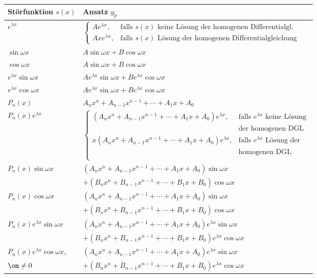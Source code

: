 \documentclass[a4paper]{article}
\begin{document}
\bigskip

\def\arraystretch{1.5}
\begin{tabular}{p{}|p{}}
\hline
St\"orfunktion $s(x)$ & Ansatz $y_p$ \\
\hline
$e^{\lambda x}$ & 
$
\left\{
\begin{array}{rl}
Ae^{\lambda x}, & \text{falls } s(x) \text{ keine L\"osung der homogenen Differentialgl.} \\
Axe^{\lambda x}, & \text{falls } s(x) \text{ L\"osung der homogenen Differentialgleichung}
\end{array} \right.
$ \\
$\sin \omega x$ & $A\sin \omega x+B\cos\omega x$ \\
$\cos \omega x$ & $A\sin \omega x+B\cos\omega x$ \\
$e^{\lambda x}\sin \omega x$ & $Ae^{\lambda x}\sin \omega x+Be^{\lambda x}\cos\omega x$ \\
$e^{\lambda x}\cos \omega x$ & $Ae^{\lambda x}\sin \omega x+Be^{\lambda x}\cos\omega x$ \\
$P_n(x)$ & $A_n x^n+A_{n-1} x^{n-1}+\cdots+A_1 x+A_0$ \\
$P_n(x)e^{\lambda x}$ & 
$
\left\{
\begin{array}{rl}
(A_n x^n+A_{n-1} x^{n-1}+\cdots+A_1 x+A_0)e^{\lambda x}, & \text{falls } e^{\lambda x} \text{ keine L\"osung} \\
 & \text{der homogenen DGL} \\
x(A_n x^n+A_{n-1} x^{n-1}+\cdots+A_1 x+A_0)e^{\lambda x}, & \text{falls } e^{\lambda x} \text{ L\"osung der} \\
 & \text{homogenen DGL} \\
\end{array} \right.
$ \\
$P_n(x)\sin \omega x$ & $(A_n x^n+A_{n-1} x^{n-1}+\cdots+A_1 x+A_0)\sin \omega x$ \\
 & \qquad$+(B_n x^n+B_{n-1} x^{n-1}+\cdots+B_1 x+B_0)\cos\omega x$ \\
$P_n(x)\cos \omega x$ & $(A_n x^n+A_{n-1} x^{n-1}+\cdots+A_1 x+A_0)\sin \omega x$ \\
 & \qquad$+(B_n x^n+B_{n-1} x^{n-1}+\cdots+B_1 x+B_0)\cos\omega x$ \\
$P_n(x)e^{\lambda x}\sin \omega x$ & $(A_n x^n+A_{n-1} x^{n-1}+\cdots+A_1 x+A_0)e^{\lambda x}\sin \omega x$ \\
 & \qquad$+(B_n x^n+B_{n-1} x^{n-1}+\cdots+B_1 x+B_0)e^{\lambda x}\cos\omega x$ \\
$P_n(x)e^{\lambda x}\cos \omega x$, & $(A_n x^n+A_{n-1} x^{n-1}+\cdots+A_1 x+A_0)e^{\lambda x}\sin \omega x$ \\
$\om\ne 0$ & \qquad$+(B_n x^n+B_{n-1} x^{n-1}+\cdots+B_1 x+B_0)e^{\lambda x}\cos\omega x$ \\
\end{tabular}
\end{document}
